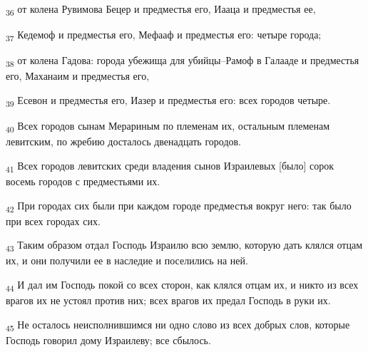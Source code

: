 \begin{tcolorbox}
\textsubscript{36} от колена Рувимова Бецер и предместья его, Иааца и предместья ее,
\end{tcolorbox}
\begin{tcolorbox}
\textsubscript{37} Кедемоф и предместья его, Мефааф и предместья его: четыре города;
\end{tcolorbox}
\begin{tcolorbox}
\textsubscript{38} от колена Гадова: города убежища для убийцы--Рамоф в Галааде и предместья его, Маханаим и предместья его,
\end{tcolorbox}
\begin{tcolorbox}
\textsubscript{39} Есевон и предместья его, Иазер и предместья его: всех городов четыре.
\end{tcolorbox}
\begin{tcolorbox}
\textsubscript{40} Всех городов сынам Мерариным по племенам их, остальным племенам левитским, по жребию досталось двенадцать городов.
\end{tcolorbox}
\begin{tcolorbox}
\textsubscript{41} Всех городов левитских среди владения сынов Израилевых [было] сорок восемь городов с предместьями их.
\end{tcolorbox}
\begin{tcolorbox}
\textsubscript{42} При городах сих были при каждом городе предместья вокруг него: так было при всех городах сих.
\end{tcolorbox}
\begin{tcolorbox}
\textsubscript{43} Таким образом отдал Господь Израилю всю землю, которую дать клялся отцам их, и они получили ее в наследие и поселились на ней.
\end{tcolorbox}
\begin{tcolorbox}
\textsubscript{44} И дал им Господь покой со всех сторон, как клялся отцам их, и никто из всех врагов их не устоял против них; всех врагов их предал Господь в руки их.
\end{tcolorbox}
\begin{tcolorbox}
\textsubscript{45} Не осталось неисполнившимся ни одно слово из всех добрых слов, которые Господь говорил дому Израилеву; все сбылось.
\end{tcolorbox}
